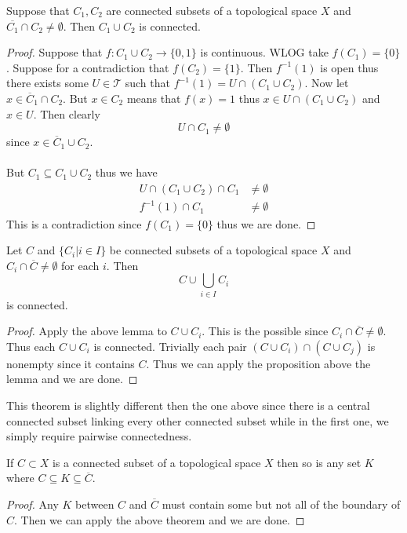 \documentclass[a4paper]{article}
\begin{document}
\begin{lmm}{}{} Suppose that $C_1,C_2$ are connected subsets of a topological space $X$ and $\overline{C_1}\cap C_2\neq\emptyset$. Then $C_1\cup C_2$ is connected. \tcbline
\begin{proof}
Suppose that $f:C_1\cup C_2\to\{0,1\}$ is continuous. WLOG take $f(C_1)=\{0\}$. Suppose for a contradiction that $f(C_2)=\{1\}$. Then $f^{-1}(1)$ is open thus there exists some $U\in\mathcal{T}$ such that $f^{-1}(1)=U\cap(C_1\cup C_2)$. Now let $x\in\overline{C}_1\cap C_2$. But $x\in C_2$ means that $f(x)=1$ thus $x\in U\cap(C_1\cup C_2)$ and $x\in U$. Then clearly $$U\cap C_1\neq\emptyset$$ since $x\in\overline{C}_1\cup C_2$. \\~\\
But $C_1\subseteq C_1\cup C_2$ thus we have 
\begin{align*}
U\cap (C_1\cup C_2)\cap C_1&\neq\emptyset\\
f^{-1}(1)\cap C_1&\neq\emptyset
\end{align*}
This is a contradiction since $f(C_1)=\{0\}$ thus we are done. 
\end{proof}
\end{lmm}

\begin{thm}{}{} Let $C$ and $\{C_i|i\in I\}$ be connected subsets of a topological space $X$ and $C_i\cap\overline{C}\neq\emptyset$ for each $i$. Then $$C\cup\bigcup_{i\in I}C_i$$ is connected. \tcbline
\begin{proof}
Apply the above lemma to $C\cup C_i$. This is the possible since $C_i\cap\overline{C}\neq\emptyset$. Thus each $C\cup C_i$ is connected. Trivially each pair $(C\cup C_i)\cap(C\cup C_j)$ is nonempty since it contains $C$. Thus we can apply the proposition above the lemma and we are done. 
\end{proof}
\end{thm}

This theorem is slightly different then the one above since there is a central connected subset linking every other connected subset while in the first one, we simply require pairwise connectedness. 

\begin{crl}{}{} If $C\subset X$ is a connected subset of a topological space $X$ then so is any set $K$ where $C\subseteq K\subseteq\overline{C}$. \tcbline
\begin{proof}
Any $K$ between $C$ and $\overline{C}$ must contain some but not all of the boundary of $C$. Then we can apply the above theorem and we are done. 
\end{proof}
\end{crl}
\end{document}
